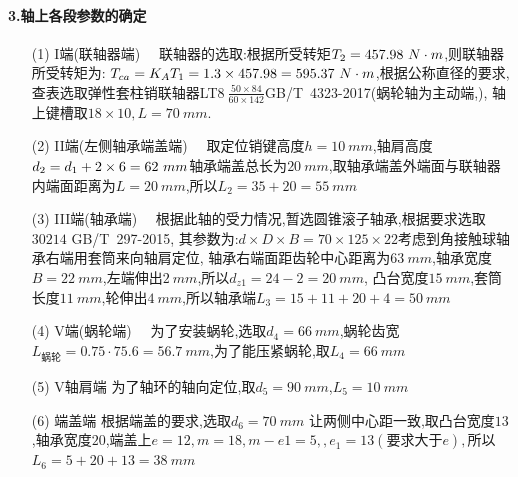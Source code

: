 \documentclass[UTF8,11pt,a4paper,oneside,final,zihao=-4,]{ctexrep}%
\newcommand{\two}[1]{\num[round-mode=places,round-precision=2] #1} %
\begin{document}
	\paragraph{3.轴上各段参数的确定}
	\begin{enumerate}
		\item[(1)] I端(联轴器端)\ \
		联轴器的选取:根据所受转矩$T_2=\two{\TII}\ N\cdot m$,则联轴器所受转矩为:
		$T_{ca}=K_A T_1=1.3\times \two{\TII}=595.37\ N\cdot m$,根据公称直径的要求,查表选取弹性套柱销联轴器LT8$\ \frac{50\times84}{60\times142}$GB/T\ 4323-2017(蜗轮轴为主动端,), 轴上键槽取$18\times10,L=70\ mm$.\ \
		\item[(2)] II端(左侧轴承端盖端)\ \
		\marginpar{\footnotesize {\color{blue}$|d_2=62$\par  $|L_2=55$}}
		取定位销键高度$h=10\ mm$,轴肩高度$d_2=d_1+2\times6=\fpeval{50+2*6}\ mm$轴承端盖总长为$20\ mm$,取轴承端盖外端面与联轴器内端面距离为$L=20\ mm$,所以$L_2=35+20=55\ mm$ 	%
		\item[(3)] III端(轴承端)\ \
		根据此轴的受力情况,暂选圆锥滚子轴承,根据要求选取$30214$ GB/T\ 297-2015,
		其参数为:$d\times D \times B=70\times125\times22$考虑到角接触球轴承右端用套筒来向轴肩定位,
		轴承右端面距齿轮中心距离为$63\ mm$,轴承宽度$B=22\ mm$,左端伸出$2\ mm$,所以$d_{z1}=24-2=20\ mm$,
		凸台宽度$15\ mm$,套筒长度$11\ mm$,轮伸出$4\ mm$,所以轴承端$L_{3}=15+11+20+4=50\ mm$
		
		
		\item[(4)] V端(蜗轮端)\ \
		为了安装蜗轮,选取$d_4=66\ mm$,蜗轮齿宽$L_{蜗轮}=0.75\cdot 75.6=56.7\ mm$,为了能压紧蜗轮,取$L_4=66\ mm$
		\item[(5)]  V轴肩端
		为了轴环的轴向定位,取$d_5=90\ mm$,$L_5=10\ mm$
		\item[(6)] 端盖端
		根据端盖的要求,选取$d_6=70\ mm$
		让两侧中心距一致,取凸台宽度$13$,轴承宽度$20$,端盖上$e=12,m=18,m-e1=5,,e_1=13(要求大于e),$所以$L_6=5+20+13=38\ mm$
	\end{enumerate}
	
\end{document}
